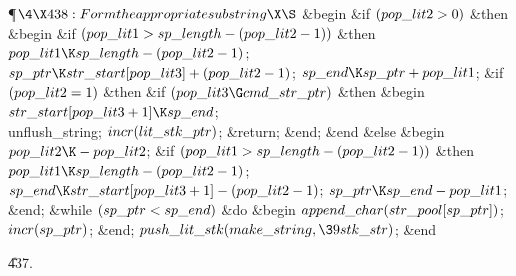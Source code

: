 \Y\P$\4\X438:Form the appropriate substring\X\S$\6
\&{begin} \&{if} $(\\{pop\_lit2}>0)$ \1\&{then}\6
\&{begin} \&{if} $(\\{pop\_lit1}>\\{sp\_length}-(\\{pop\_lit2}-1))$ \1%
\&{then}\5
$\\{pop\_lit1}\K\\{sp\_length}-(\\{pop\_lit2}-1)$;\2\6
$\\{sp\_ptr}\K\\{str\_start}[\\{pop\_lit3}]+(\\{pop\_lit2}-1)$;\5
$\\{sp\_end}\K\\{sp\_ptr}+\\{pop\_lit1}$;\6
\&{if} $(\\{pop\_lit2}=1)$ \1\&{then}\6
\&{if} $(\\{pop\_lit3}\G\\{cmd\_str\_ptr})$ \1\&{then}\6
\&{begin} $\\{str\_start}[\\{pop\_lit3}+1]\K\\{sp\_end}$;\5
\\{unflush\_string};\5
$\\{incr}(\\{lit\_stk\_ptr})$;\5
\&{return};\6
\&{end};\2\2\6
\&{end}\6
\4\&{else} \2\6
\&{begin} $\\{pop\_lit2}\K-\\{pop\_lit2}$;\6
\&{if} $(\\{pop\_lit1}>\\{sp\_length}-(\\{pop\_lit2}-1))$ \1\&{then}\5
$\\{pop\_lit1}\K\\{sp\_length}-(\\{pop\_lit2}-1)$;\2\6
$\\{sp\_end}\K\\{str\_start}[\\{pop\_lit3}+1]-(\\{pop\_lit2}-1)$;\5
$\\{sp\_ptr}\K\\{sp\_end}-\\{pop\_lit1}$;\6
\&{end};\6
\&{while} $(\\{sp\_ptr}<\\{sp\_end})$ \1\&{do}\6
\&{begin} $\\{append\_char}(\\{str\_pool}[\\{sp\_ptr}])$;\5
$\\{incr}(\\{sp\_ptr})$;\6
\&{end};\2\6
$\\{push\_lit\_stk}(\\{make\_string},\39\\{stk\_str})$;\6
\&{end}\par
\U437.\fi

